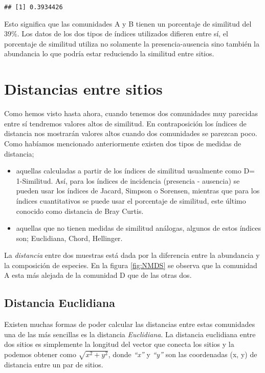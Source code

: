 \documentclass[
]{article}
\begin{document}
\begin{verbatim}
## [1] 0.3934426
\end{verbatim}

Esto significa que las comunidades A y B tienen un porcentaje de similitud del 39\%. Los datos de los dos tipos de índices utilizados difieren entre sí, el porcentaje de similitud utiliza no solamente la presencia-ausencia sino también la abundancia lo que podría estar reduciendo la similitud entre sitios.

\hypertarget{distancias-entre-sitios}{%
\section{Distancias entre sitios}\label{distancias-entre-sitios}}

Como hemos visto hasta ahora, cuando tenemos dos comunidades muy parecidas entre sí tendremos valores altos de similitud. En contraposición los índices de distancia nos mostrarán valores altos cuando dos comunidades se parezcan poco. Como habíamos mencionado anteriormente existen dos tipos de medidas de distancia;

\begin{itemize}
\item
  aquellas calculadas a partir de los índices de similitud usualmente como D= 1-Similitud. Así, para los índices de incidencia (presencia - ausencia) se pueden usar los índices de Jacard, Simpson o Sorensen, mientras que para los índices cuantitativos se puede usar el porcentaje de similitud, este último conocido como distancia de Bray Curtis.
\item
  aquellas que no tienen medidas de similitud análogas, algunos de estos índices son; Euclidiana, Chord, Hellinger.
\end{itemize}

La \emph{distancia} entre dos muestras está dada por la diferencia entre la abundancia y la composición de especies. En la figura \ref{fig:NMDS} se observa que la comunidad A esta más alejada de la comunidad D que de las otras dos.

\hypertarget{distancia-euclidiana}{%
\subsection{Distancia Euclidiana}\label{distancia-euclidiana}}

Existen muchas formas de poder calcular las distancias entre estas comunidades una de las más sencillas es la distancia \emph{Euclidiana}. La distancia euclidiana entre dos sitios es simplemente la longitud del vector que conecta los sitios y la podemos obtener como \(\sqrt{x^2+y^2}\), donde \emph{``x''} y \emph{``y''} son las coordenadas (x, y) de distancia entre un par de sitios.
\end{document}

